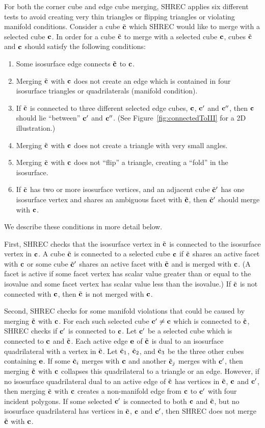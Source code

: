 For both the corner cube and edge cube merging,
SHREC applies six different tests to avoid creating very thin triangles
or flipping triangles or violating manifold conditions.
Consider a cube ${\tilde{\mathbf{c}}}$ which SHREC would like to merge 
with a selected cube $\mathbf{c}$.
In order for a cube ${\tilde{\mathbf{c}}}$ to merge with a selected cube $\mathbf{c}$,
cubes ${\tilde{\mathbf{c}}}$ and $\mathbf{c}$ should satisfy the following conditions:
\begin{enumerate}
\item Some isosurface edge connects ${\tilde{\mathbf{c}}}$ to $\mathbf{c}$.
\item Merging ${\tilde{\mathbf{c}}}$ with $\mathbf{c}$ does not create an edge 
which is contained in four isosurface triangles or quadrilaterals
(manifold condition).
\item If ${\tilde{\mathbf{c}}}$ is connected to three different selected edge cubes,
$\mathbf{c}$, $\mathbf{c}'$ and $\mathbf{c}''$,
then $\mathbf{c}$ should lie ``between'' $\mathbf{c}'$ and $\mathbf{c}''$.
(See Figure~\ref{fig:connectedToIII} for a 2D illustration.)
\item Merging ${\tilde{\mathbf{c}}}$ with $\mathbf{c}$ does not create a triangle
with very small angles.
\item Merging ${\tilde{\mathbf{c}}}$ with $\mathbf{c}$ does not ``flip'' a triangle,
creating a ``fold'' in the isosurface.
\item If ${\tilde{\mathbf{c}}}$ has two or more isosurface vertices,
and an adjacent cube ${\tilde{\mathbf{c}}}'$ has one isosurface vertex
and shares an ambiguous facet with ${\tilde{\mathbf{c}}}$,
then ${\tilde{\mathbf{c}}}'$ should merge with $\mathbf{c}$.
\end{enumerate}
We describe these conditions in more detail below.

First, SHREC checks that the isosurface vertex in ${\tilde{\mathbf{c}}}$
is connected to the isosurface vertex in $\mathbf{c}$.
A cube ${\tilde{\mathbf{c}}}$ is connected to a selected cube $\mathbf{c}$
if ${\tilde{\mathbf{c}}}$ shares an active facet with $\mathbf{c}$
or some cube ${\tilde{\mathbf{c}}}'$ shares an active facet with ${\tilde{\mathbf{c}}}$ and
is merged with $\mathbf{c}$.
(A facet is active if some facet vertex has scalar value greater than
or equal to the isovalue and some facet vertex has scalar value less
than the isovalue.)
If ${\tilde{\mathbf{c}}}$ is not connected with $\mathbf{c}$, then ${\tilde{\mathbf{c}}}$ is not merged with $\mathbf{c}$.

Second, SHREC checks for some manifold violations that
could be caused by merging ${\tilde{\mathbf{c}}}$ with $\mathbf{c}$.
For each such selected cube $\mathbf{c}' \neq \mathbf{c}$ which is connected to ${\tilde{\mathbf{c}}}$,
SHREC checks if $\mathbf{c}'$ is connected to $\mathbf{c}$.
Let $\mathbf{c}'$ be a selected cube which is connected to $\mathbf{c}$ and ${\tilde{\mathbf{c}}}$.
Each active edge $\mathbf{e}$ of ${\tilde{\mathbf{c}}}$ is dual to an isosurface quadrilateral
with a vertex in ${\tilde{\mathbf{c}}}$.
Let ${\tilde{\mathbf{c}}}_1$, ${\tilde{\mathbf{c}}}_2$, and ${\tilde{\mathbf{c}}}_3$ be the three other cubes containing $\mathbf{e}$.
If some ${\tilde{\mathbf{c}}}_i$ merges with $\mathbf{c}$ and another ${\tilde{\mathbf{c}}}_j$ merges with $\mathbf{c}'$,
then merging ${\tilde{\mathbf{c}}}$ with $\mathbf{c}$ collapses this quadrilateral to a triangle
or an edge.
However, if no isosurface quadrilateral dual to an active edge of ${\tilde{\mathbf{c}}}$
has vertices in ${\tilde{\mathbf{c}}}$, $\mathbf{c}$ and $\mathbf{c}'$,
then merging ${\tilde{\mathbf{c}}}$ with $\mathbf{c}$ creates a non-manifold edge 
from $\mathbf{c}$ to $\mathbf{c}'$ with four incident polygons.
If some selected $\mathbf{c}'$ is connected to both $\mathbf{c}$ and ${\tilde{\mathbf{c}}}$,
but no isosurface quadrilateral has vertices in ${\tilde{\mathbf{c}}}$, $\mathbf{c}$ and $\mathbf{c}'$,
then SHREC does not merge ${\tilde{\mathbf{c}}}$ with $\mathbf{c}$.

